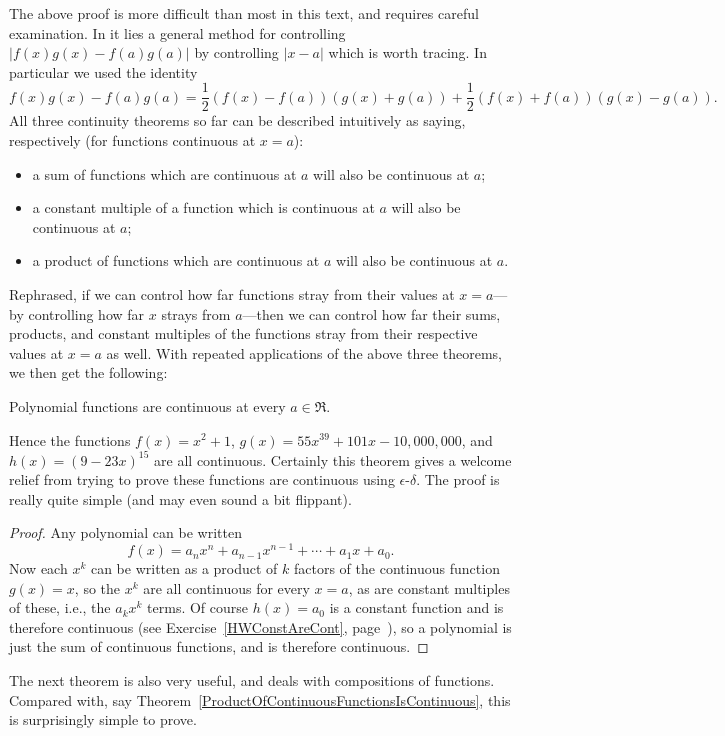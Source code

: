 The above proof is more difficult than most in this text, and requires
careful examination.  In it lies a general method for controlling
$|f(x)g(x)-f(a)g(a)|$ by controlling $|x-a|$ which is worth
tracing.  In particular we used the identity
$$f(x)g(x)-f(a)g(a)=\frac12(f(x)-f(a))(g(x)+g(a))
+\frac12(f(x)+f(a))(g(x)-g(a)).$$
All three continuity theorems so far can be
described intuitively as saying, respectively
(for functions continuous at $x=a$):
{\bf\begin{itemize}
\item a sum of functions which are continuous at $a$ 
will also be continuous at $a$;
\item a constant multiple of a function which is continuous
at $a$ will also be continuous at $a$;
\item a product of functions which are continuous at $a$
will also be continuous at $a$.
\end{itemize}}
Rephrased, if we can control how far functions stray from their
values at $x=a$---by controlling how far $x$ strays from $a$---then
we can control how far their sums, products, and constant multiples
of the functions stray from their respective values at $x=a$ as
well. 
With repeated applications of
the above three theorems, we then get the following:

\begin{theorem}Polynomial functions are continuous at every $a\in\Re$.
\label{PolynomialsContinuousEverywhere}\end{theorem}
Hence the functions $f(x)=x^2+1$, $g(x)=55x^{39}+101x-10,000,000$,
and $h(x)=(9-23x)^{15}$ are all continuous.  Certainly this 
theorem gives a welcome relief from trying to prove 
these functions are continuous using $\epsilon$-$\delta$.
The proof is really quite simple (and may even sound
a bit flippant).

\begin{proof}
Any polynomial can be written
$$f(x)=a_nx^n+a_{n-1}x^{n-1}+\cdots+a_1x+a_0.$$
Now each $x^k$ can be written as a product of $k$ factors
of the continuous function $g(x)=x$, so the $x^k$ are all continuous
for every $x=a$, 
as are constant multiples of these, i.e., the $a_kx^k$ terms.
Of course $h(x)=a_0$ is a constant function and is therefore
continuous (see Exercise~\ref{HWConstAreCont}, page~\pageref{HWConstAreCont}), 
so a polynomial is just the sum of continuous
functions, and is therefore continuous.
\end{proof}

The next theorem is also very useful, and deals with
compositions of functions.
Compared with, say
Theorem~\ref{ProductOfContinuousFunctionsIsContinuous},
this is surprisingly simple to prove.

